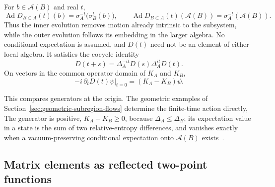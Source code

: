 \documentclass[a4paper,11pt]{article}
\theoremstyle{definition}
\begin{document}
For $b\in\mathcal A(B)$ and real $t$,
\begin{equation}
 \operatorname{Ad}D_{B\subset A}(t)(b)=\sigma_A^{-t}\bigl(\sigma_B^t(b)\bigr),
 \qquad
 \operatorname{Ad}D_{B\subset A}(t)(\mathcal A(B))=\sigma_A^{-t}(\mathcal A(B)).
 \label{eq:transport}
\end{equation}
Thus the inner evolution removes motion already intrinsic to the subsystem, while the outer evolution follows its embedding in the larger algebra. No conditional expectation is assumed, and $D(t)$ need not be an element of either local algebra. It satisfies the cocycle identity
\begin{equation}
 D(t+s)=\Delta_A^{-it}D(s)\Delta_A^{it}D(t).
 \label{eq:cocycle}
\end{equation}
On vectors in the common operator domain of $K_A$ and $K_B$,
\begin{equation}
 -i\,\partial_tD(t)\psi\big|_{t=0}=(K_A-K_B)\psi .
 \label{eq:generator}
\end{equation}


This compares generators at the origin.  The geometric examples of Section~\ref{sec:geometric-subregion-flows} determine the finite-time action directly,  The generator is positive, $K_A-K_B\ge0$, because $\Delta_A\le\Delta_B$; its expectation value in a state is the sum of two relative-entropy differences, and vanishes exactly when a vacuum-preserving conditional expectation onto $\mathcal A(B)$ exists~\cite{companionQEC}.

\subsection{Matrix elements as reflected two-point functions}\label{subsec:matrix-elements}
\end{document}
